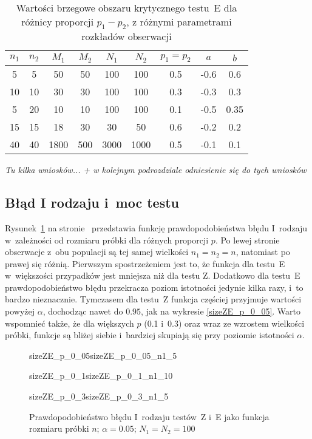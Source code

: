 \begin{table}
\centering
\caption{Wartości brzegowe obszaru krytycznego testu~E dla różnicy proporcji $p_1-p_2$, z różnymi parametrami rozkładów obserwacji}
\label{r3:tabab}
\begin{tabular}{|c|c|c|c|c|c|c|c|c|} \hline
	$n_1$ & $n_2$ & $M_1$ & $M_2$ & $N_1$ & $N_2$ & $p_1 = p_2$ & $a$ & $b$ \\
	\hline \hline
	5 & 5 & 50 & 50 & 100 & 100 & 0.5 & -0.6 & 0.6 \\
	10 & 10 & 30 & 30 & 100 & 100 & 0.3 & -0.3 & 0.3 \\
	5 & 20 & 10 & 10 & 100 & 100 & 0.1 & -0.5 & 0.35 \\
	15 & 15 & 18 & 30 & 30 & 50 & 0.6 & -0.2 & 0.2 \\
	40 & 40 & 1800 & 500 & 3000 & 1000 & 0.5 & -0.1 & 0.1 \\
	\hline
\end{tabular}
\end{table}


\textit{Tu kilka wniosków... + w kolejnym podrozdziale odniesienie się do tych wniosków}

\subsection{Błąd I rodzaju i~moc testu}
Rysunek~\ref{sizeZE_n} na stronie~\pageref{sizeZE_n} przedstawia funkcję prawdopodobieństwa błędu I~rodzaju w~zależności od rozmiaru próbki dla różnych proporcji $p$. Po lewej stronie obserwacje z~obu populacji są tej samej wielkości $n_1=n_2=n$, natomiast po prawej się różnią. Pierwszym spostrzeżeniem jest to, że funkcja dla testu~E w~większości przypadków jest mniejsza niż dla testu Z. Dodatkowo dla testu~E prawdopodobieństwo błędu przekracza poziom istotności jedynie kilka razy, i~to bardzo nieznacznie. Tymczasem dla testu~Z funkcja częściej przyjmuje wartości powyżej $\alpha$, dochodząc nawet do $0.95$, jak na wykresie \ref{sizeZE_p_0_05}. Warto wspomnieć także, że dla większych $p$ (0.1 i~0.3) oraz wraz ze wzrostem wielkości próbki, funkcje są bliżej siebie i~bardziej skupiają się przy poziomie istotności $\alpha$.

\begin{figure}[p]
	\begin{subdiagrams}{sizeZE_p_0_05}{sizeZE_p_0_05_n1_5}
	\end{subdiagrams}
	
	\begin{subdiagrams}{sizeZE_p_0_1}{sizeZE_p_0_1_n1_10}
	\end{subdiagrams}
	
	\begin{subdiagrams}{sizeZE_p_0_3}{sizeZE_p_0_3_n1_5}
	\end{subdiagrams}
	\caption{Prawdopodobieństwo błędu I~rodzaju testów~Z i~E jako funkcja rozmiaru próbki $n$; $\alpha=0.05$; $N_1=N_2=100$}
	\label{sizeZE_n}
\end{figure}

